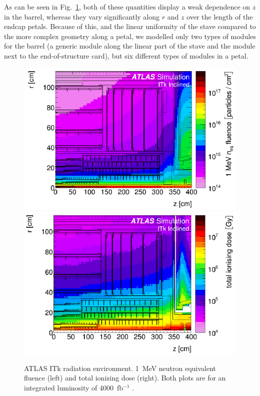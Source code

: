 As can be seen in Fig.~\ref{fig:radiation}, both of these quantities display a weak dependence on $z$ in the barrel, whereas they vary significantly along $r$ and $z$ over the length of the endcap petals. Because of this, and the linear uniformity of the stave compared to the more complex geometry along a petal, we modelled only two types of modules for the barrel (a generic module along the linear part of the stave and the module next to the end-of-structure card), but six different types of modules in a petal.

\begin{figure}[ht]
\centering
\includegraphics[width=0.48\linewidth]{figures/fluence.pdf}\quad
\includegraphics[width=0.48\linewidth]{figures/TID.pdf}
\caption{ATLAS ITk radiation environment. 1~MeV neutron equivalent fluence (left) and total ionizing dose (right). Both plots are for an integrated luminosity of 4000~fb$^{-1}$ \cite{Collaboration:2017mtb}.}
\label{fig:radiation}
\end{figure}


